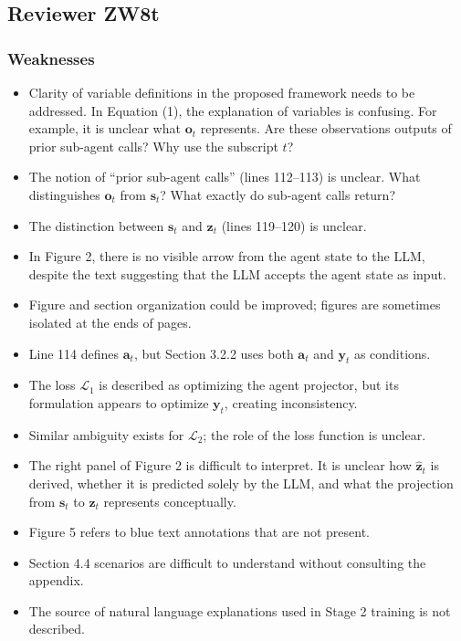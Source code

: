 \documentclass{article}
\theoremstyle{plain}
\theoremstyle{definition}
\theoremstyle{remark}
\begin{document}
\subsection*{Reviewer ZW8t}

\subsubsection*{Weaknesses}

\begin{itemize}
    \item Clarity of variable definitions in the proposed framework needs to be addressed. In Equation (1), the explanation of variables is confusing. For example, it is unclear what $\mathbf{o}_t$ represents. Are these observations outputs of prior sub-agent calls? Why use the subscript $t$?
    \item The notion of ``prior sub-agent calls'' (lines 112--113) is unclear. What distinguishes $\mathbf{o}_t$ from $\mathbf{s}_t$? What exactly do sub-agent calls return?
    \item The distinction between $\mathbf{s}_t$ and $\mathbf{z}_t$ (lines 119--120) is unclear.
    \item In Figure 2, there is no visible arrow from the agent state to the LLM, despite the text suggesting that the LLM accepts the agent state as input.
    \item Figure and section organization could be improved; figures are sometimes isolated at the ends of pages.
    \item Line 114 defines $\mathbf{a}_t$, but Section 3.2.2 uses both $\mathbf{a}_t$ and $\mathbf{y}_t$ as conditions.
    \item The loss $\mathcal{L}_1$ is described as optimizing the agent projector, but its formulation appears to optimize $\mathbf{y}_t$, creating inconsistency.
    \item Similar ambiguity exists for $\mathcal{L}_2$; the role of the loss function is unclear.
    \item The right panel of Figure 2 is difficult to interpret. It is unclear how $\hat{\mathbf{z}}_t$ is derived, whether it is predicted solely by the LLM, and what the projection from $\mathbf{s}_t$ to $\mathbf{z}_t$ represents conceptually.
    \item Figure 5 refers to blue text annotations that are not present.
    \item Section 4.4 scenarios are difficult to understand without consulting the appendix.
    \item The source of natural language explanations used in Stage 2 training is not described.

\end{itemize}
\end{document}
